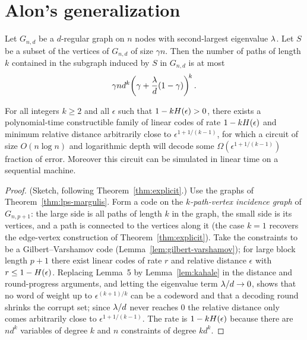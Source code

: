 \chapter{Alon's generalization}


\begin{lemma}
  \label{lem:kahale}
  \notready
  Let $G_{n,d}$ be a $d$-regular graph on $n$ nodes with second-largest
  eigenvalue $\lambda$. Let $S$ be a subset of the vertices of $G_{n,d}$ of size
  $\gamma n$. Then the number of paths of length $k$ contained in the subgraph
  induced by $S$ in $G_{n,d}$ is at most
  \[
    \gamma n d^k\!\left(\gamma + \frac{\lambda}{d}(1-\gamma)\right)^{\!k}.
  \]
\end{lemma}

\begin{theorem}
  \label{thm:alon-general}
  \notready
  For all integers $k\ge 2$ and all $\epsilon$ such that $1-kH(\epsilon)>0$,
  there exists a polynomial-time constructible family of linear codes of rate
  $1-kH(\epsilon)$ and minimum relative distance arbitrarily close to
  $\epsilon^{1+1/(k-1)}$, for which a circuit of size $O(n\log n)$ and
  logarithmic depth will decode some $\Omega(\epsilon^{1+1/(k-1)})$ fraction of
  error. Moreover this circuit can be simulated in linear time on a sequential
  machine.
\end{theorem}
\begin{proof}
  (Sketch, following Theorem~\ref{thm:explicit}.) Use the graphs of
  Theorem~\ref{thm:lps-margulis}. Form a code on the
  \emph{$k$-path-vertex incidence graph} of $G_{n,p+1}$: the large side is all
  paths of length $k$ in the graph, the small side is its vertices, and a path
  is connected to the vertices along it (the case $k=1$ recovers the edge-vertex
  construction of Theorem~\ref{thm:explicit}). Take the constraints to be a
  Gilbert--Varshamov code (Lemma~\ref{lem:gilbert-varshamov}); for large block
  length $p+1$ there exist linear codes of rate $r$ and relative distance
  $\epsilon$ with $r \le 1-H(\epsilon)$. Replacing Lemma~5 by
  Lemma~\ref{lem:kahale} in the distance and round-progress arguments, and
  letting the eigenvalue term $\lambda/d \to 0$, shows that no word of weight up
  to $\epsilon^{(k+1)/k}$ can be a codeword and that a decoding round shrinks the
  corrupt set; since $\lambda/d$ never reaches $0$ the relative distance only
  comes arbitrarily close to $\epsilon^{1+1/(k-1)}$. The rate is
  $1-kH(\epsilon)$ because there are $nd^k$ variables of degree $k$ and $n$
  constraints of degree $kd^k$.
\end{proof}


